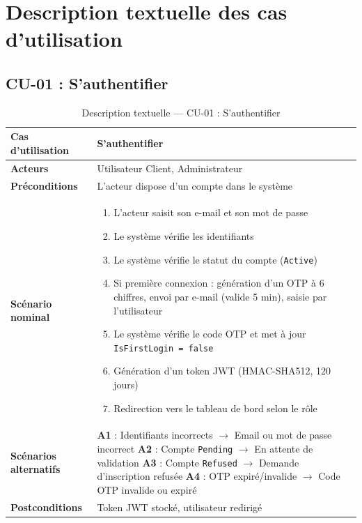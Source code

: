 \documentclass[a4paper,12pt]{report}
\begin{document}
\section{Description textuelle des cas d'utilisation}

\subsection{CU-01 : S'authentifier}

\begin{table}[htbp]
\centering
\caption{Description textuelle — CU-01 : S'authentifier}
\begin{tabularx}{\textwidth}{|l|X|}
\hline
\textbf{Cas d'utilisation} & S'authentifier \\
\hline
\textbf{Acteurs} & Utilisateur Client, Administrateur \\
\hline
\textbf{Préconditions} & L'acteur dispose d'un compte dans le système \\
\hline
\textbf{Scénario nominal} &
\begin{enumerate}[nosep, leftmargin=*]
    \item L'acteur saisit son e-mail et son mot de passe
    \item Le système vérifie les identifiants
    \item Le système vérifie le statut du compte (\texttt{Active})
    \item Si première connexion : génération d'un OTP à 6 chiffres, envoi par e-mail (valide 5 min), saisie par l'utilisateur
    \item Le système vérifie le code OTP et met à jour \texttt{IsFirstLogin = false}
    \item Génération d'un token JWT (HMAC-SHA512, 120 jours)
    \item Redirection vers le tableau de bord selon le rôle
\end{enumerate} \\
\hline
\textbf{Scénarios alternatifs} &
\textbf{A1} : Identifiants incorrects $\rightarrow$ \og{}Email ou mot de passe incorrect\fg{} \newline
\textbf{A2} : Compte \texttt{Pending} $\rightarrow$ \og{}En attente de validation\fg{} \newline
\textbf{A3} : Compte \texttt{Refused} $\rightarrow$ \og{}Demande d'inscription refusée\fg{} \newline
\textbf{A4} : OTP expiré/invalide $\rightarrow$ \og{}Code OTP invalide ou expiré\fg{} \\
\hline
\textbf{Postconditions} & Token JWT stocké, utilisateur redirigé \\
\hline
\end{tabularx}
\end{table}
\end{document}
